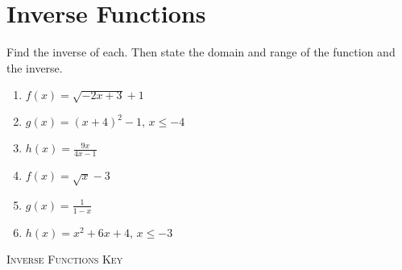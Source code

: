 \chapter{Inverse Functions}

Find the inverse of each. Then state the domain and range of the function and the inverse.

\begin{enumerate}
	\item $f(x) = \sqrt{-2x + 3} + 1$
	\item $g(x) = (x+4)^2 - 1, \, x \leq -4$
	\item $h(x) = \frac{9x}{4x-1}$
	\item $f(x) = \sqrt{x} - 3$
	\item $g(x) = \frac{1}{1-x}$
	\item $h(x) = x^2 + 6x + 4, \, x \leq -3$
\end{enumerate}

\newpage

\textsc{Inverse Functions Key}

